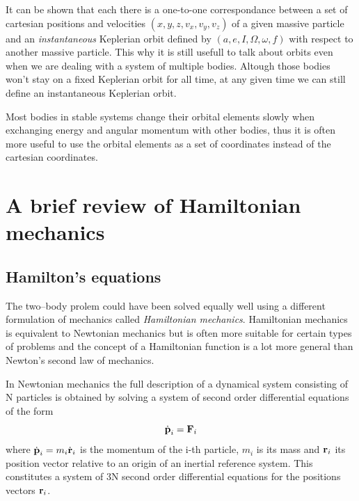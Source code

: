 It can be shown that each there is a one-to-one correspondance between 
a set of cartesian positions and velocities $(x,y,z,v_x,v_y,v_z)$ 
of a given massive particle and an \emph{instantaneous} Keplerian orbit 
defined by $(a,e,I,\Omega,\omega,f)$ with respect to another massive
particle. This why it is still usefull to talk about orbits even
when we are dealing with a system of multiple bodies. Altough those
bodies won't stay on a fixed Keplerian orbit for all time, at any given
time we can still define an instantaneous Keplerian orbit.

Most bodies in stable systems change their orbital elements slowly
when exchanging energy and angular momentum with other bodies, thus
it is often more useful to use the orbital elements as a set of coordinates
instead of the cartesian coordinates.

\section{A brief review of Hamiltonian mechanics}
\label{sec:hamiltonian_mechanics}
\subsection{Hamilton's equations}
\label{sub:Hamilton's equations}
The two--body prolem could have been solved equally well using a different
formulation of mechanics called \emph{Hamiltonian mechanics}. Hamiltonian
mechanics is equivalent to Newtonian mechanics but is often more suitable
for certain types of problems and the concept of a Hamiltonian function
is a lot more general than Newton's second law of mechanics.

In Newtonian mechanics the full description of a dynamical system 
consisting of N particles is 
obtained by solving a system of second order differential equations
of the form
\begin{equation}
    \dot{\boldsymbol{\mathbf{p}}}_i=\boldsymbol{\mathbf{F}}_i
\end{equation}
where $\dot{\boldsymbol{\mathbf{p}}}_i=m_i\dot{\boldsymbol{\mathbf{r}}}_i$ is the momentum of the
i-th particle, $m_i$ is its mass and $\boldsymbol{\mathbf{r}}_i$ its position vector
relative to an origin of an inertial reference system. This 
constitutes a system of 3N second order differential equations for
the positions vectors $\boldsymbol{\mathbf{r}}_i$. 

